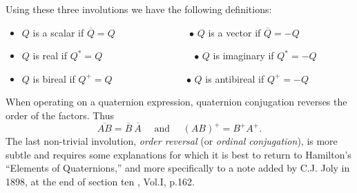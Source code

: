 \documentclass [12pt,a4paper      ]{article}
\newcommand{\CON}{\overline}          %
\begin{document}
     Using   these  three  involutions  we  have  the   following 
definitions:

\begin{itemize}
\item $Q$ is a scalar if  $\CON{Q}=Q$ ~~~ ~~~ ~~~ ~~~ $\bullet$ $Q$ is a vector   if  $\CON{Q}=-Q$
\item $Q$ is real     if  $Q^*     =Q$ ~~~ ~~~ ~~~ ~~~ ~~~ $\bullet$ $Q$ is imaginary  if  $Q^*     =-Q$
\item $Q$ is bireal   if  $Q^+     =Q$ ~~~ ~~~ ~~~ ~~~ $\bullet$ $Q$ is antibireal if  $Q^+     =-Q$
\end{itemize}

     When  operating  on  a  quaternion  expression,   quaternion 
conjugation reverses the order of the factors.  Thus
%
\begin{equation}\label{E7}
\CON{AB} = \CON{B} ~ \CON{A}\text{~~~~and~~~~} (AB)^+ = B^+ A^+.  %
\end{equation}
%
     The last non-trivial involution, \emph{order reversal} (or \emph{ordinal conjugation}), 
is more subtle and requires some explanations for which it is best 
to  return  to  Hamilton's ``Elements of  Quaternions,''  and  more 
specifically to a note added by C.J.  Joly in 1898, at the end of 
section ten \cite{R7}, Vol.I, p.162.
\end{document}

